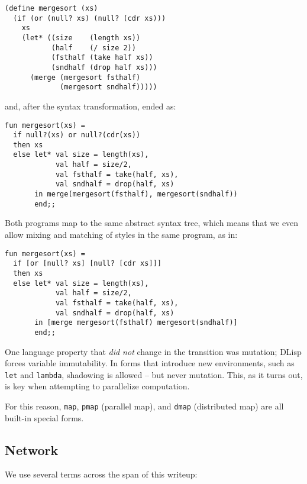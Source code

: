\documentclass[letterpaper,twocolumn,10pt]{article}
\begin{document}
\begin{verbatim}
(define mergesort (xs)
  (if (or (null? xs) (null? (cdr xs)))
    xs
    (let* ((size    (length xs))
           (half    (/ size 2))
           (fsthalf (take half xs))
           (sndhalf (drop half xs)))
      (merge (mergesort fsthalf)
             (mergesort sndhalf)))))
\end{verbatim}

\newpage

and, after the syntax transformation, ended as:

\begin{verbatim}
fun mergesort(xs) =
  if null?(xs) or null?(cdr(xs))
  then xs
  else let* val size = length(xs),
            val half = size/2,
            val fsthalf = take(half, xs),
            val sndhalf = drop(half, xs)
       in merge(mergesort(fsthalf), mergesort(sndhalf))
       end;;
\end{verbatim}

Both programs map to the same abstract syntax tree, which means that we even
allow mixing and matching of styles in the same program, as in:

\begin{verbatim}
fun mergesort(xs) =
  if [or [null? xs] [null? [cdr xs]]]
  then xs
  else let* val size = length(xs),
            val half = size/2,
            val fsthalf = take(half, xs),
            val sndhalf = drop(half, xs)
       in [merge mergesort(fsthalf) mergesort(sndhalf)]
       end;;
\end{verbatim}

One language property that \textit{did not} change in the transition was
mutation; DLisp forces variable immutability. In forms that introduce new
environments, such as \verb|let| and \verb|lambda|, shadowing is allowed -- but
never mutation. This, as it turns out, is key when attempting to parallelize
computation.

For this reason, \verb|map|, \verb|pmap| (parallel map), and \verb|dmap|
(distributed map) are all built-in special forms.

\newpage

\subsection{Network}

We use several terms across the span of this writeup:
\end{document}
